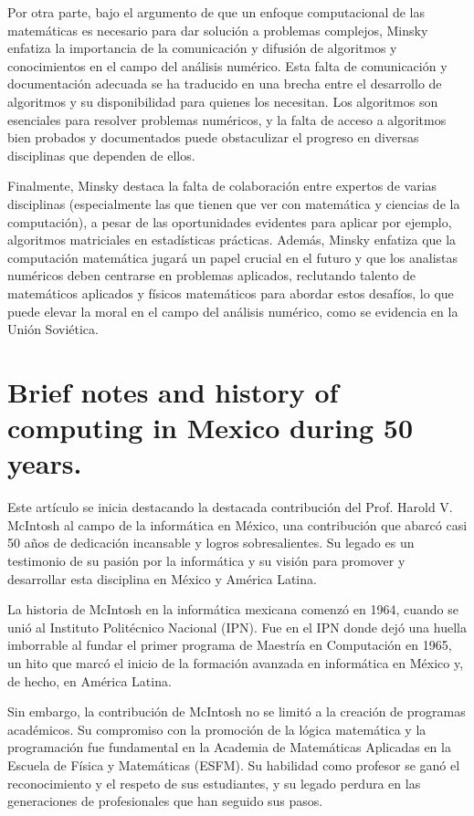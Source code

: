 \documentclass[12pt]{article} %
\begin{document}
	Por otra parte, bajo el argumento de que un enfoque computacional de las matemáticas es necesario para dar solución a problemas complejos, Minsky enfatiza la importancia de la comunicación y difusión de algoritmos y conocimientos en el campo del análisis numérico. Esta falta de comunicación y documentación adecuada se ha traducido en una brecha entre el desarrollo de algoritmos y su disponibilidad para quienes los necesitan. Los algoritmos son esenciales para resolver problemas numéricos, y la falta de acceso a algoritmos bien probados y documentados puede obstaculizar el progreso en diversas disciplinas que dependen de ellos.
	
	Finalmente, Minsky destaca la falta de colaboración entre expertos de varias disciplinas (especialmente las que tienen que ver con matemática y ciencias de la computación), a pesar de las oportunidades evidentes para aplicar por ejemplo, algoritmos matriciales en estadísticas prácticas. Además, Minsky enfatiza que la computación matemática jugará un papel crucial en el futuro y que los analistas numéricos deben centrarse en problemas aplicados, reclutando talento de matemáticos aplicados y físicos matemáticos para abordar estos desafíos, lo que puede elevar la moral en el campo del análisis numérico, como se evidencia en la Unión Soviética.
	
	
	\section{Brief notes and history of computing in Mexico during 50 years.}
	
	Este artículo se inicia destacando la destacada contribución del Prof. Harold V. McIntosh al campo de la informática en México, una contribución que abarcó casi 50 años de dedicación incansable y logros sobresalientes. Su legado es un testimonio de su pasión por la informática y su visión para promover y desarrollar esta disciplina en México y América Latina.
	
	La historia de McIntosh en la informática mexicana comenzó en 1964, cuando se unió al Instituto Politécnico Nacional (IPN). Fue en el IPN donde dejó una huella imborrable al fundar el primer programa de Maestría en Computación en 1965, un hito que marcó el inicio de la formación avanzada en informática en México y, de hecho, en América Latina.
	
	Sin embargo, la contribución de McIntosh no se limitó a la creación de programas académicos. Su compromiso con la promoción de la lógica matemática y la programación fue fundamental en la Academia de Matemáticas Aplicadas en la Escuela de Física y Matemáticas (ESFM). Su habilidad como profesor se ganó el reconocimiento y el respeto de sus estudiantes, y su legado perdura en las generaciones de profesionales que han seguido sus pasos.
\end{document}
